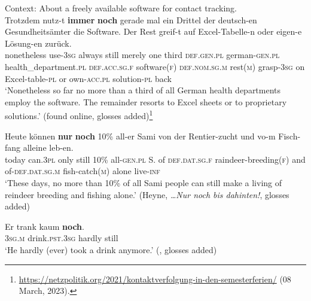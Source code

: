 \begin{exe}
	\ex\label{appendixGermanScalar5}
	Context: About a freely available software for contact tracking.\\
	\gll Trotzdem nutz-t \textbf{immer} \textbf{noch} {gerade mal} ein Drittel der deutsch-en Gesundheitsämter die Software. Der Rest greif-t auf Excel-Tabelle-n oder eigen-e Lösung-en zurück.\\
	nonetheless use-3\textsc{sg} always still merely one third \textsc{def}.\textsc{gen}.\textsc{pl} german-\textsc{gen}.\textsc{pl} health\_department.\textsc{pl} \textsc{def}.\textsc{acc}.\textsc{sg}.\textsc{f} software(\textsc{f}) \textsc{def}.\textsc{nom}.\textsc{sg}.\textsc{m} rest(\textsc{m}) grasp-3\textsc{sg} on Excel-table-\textsc{pl} or own-\textsc{acc}.\textsc{pl} solution-\textsc{pl} back\\
	\glt \lq Nonetheless so far no more than a third of all German health departments employ the software. The remainder resorts to Excel sheets or to proprietary solutions.\rq{ }(found online, glosses added)\footnote{\url{https://netzpolitik.org/2021/kontaktverfolgung-in-den-semesterferien/} (08 March, 2023).}
	

	\ex\label{appendixGermanScalar6}
	\gll Heute können \textbf{nur} \textbf{noch} 10\% all-er Sami von der Rentier-zucht und vo-m Fisch-fang alleine leb-en.\\
	today can.3\textsc{pl} only still 10\% all-\textsc{gen}.\textsc{pl} S. of \textsc{def}.\textsc{dat}.\textsc{sg}.\textsc{f} raindeer-breeding(\textsc{f}) and of-\textsc{def}.\textsc{dat}.\textsc{sg}.\textsc{m} fish-catch(\textsc{m}) alone live-\textsc{inf}\\
	\glt \lq These days, no more than 10\% of all Sami people can still make a living of reindeer breeding and fishing alone.\rq{ }(Heyne, \textit{…Nur noch bis dahinten!}, glosses added)

	\ex\label{appendixGermanScalar7}
	\gll Er trank kaum \textbf{noch}.\\
	3\textsc{sg}.\textsc{m} drink.\textsc{pst}.3\textsc{sg} hardly still\\
	\glt \lq He hardly (ever) took a drink anymore.\rq{ }(\cite[172]{KoenigEtAl1993}, glosses added)
\end{exe}

